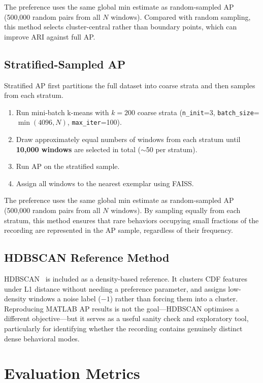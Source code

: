 \documentclass[11pt]{article}
\begin{document}
The preference uses the same global min estimate as random-sampled AP (500,000 random pairs from all $N$ windows). Compared with random sampling, this method selects cluster-central rather than boundary points, which can improve ARI against full AP.

\subsection{Stratified-Sampled AP}

Stratified AP first partitions the full dataset into coarse strata and then samples from each stratum.

\begin{enumerate}
    \item Run mini-batch k-means with $k = 200$ coarse strata (\texttt{n\_init}=3, \texttt{batch\_size}=$\min(4096, N)$, \texttt{max\_iter}=100).
    \item Draw approximately equal numbers of windows from each stratum until \textbf{10,000 windows} are selected in total ($\sim$50 per stratum).
    \item Run AP on the stratified sample.
    \item Assign all windows to the nearest exemplar using FAISS.
\end{enumerate}

The preference uses the same global min estimate as random-sampled AP (500,000 random pairs from all $N$ windows). By sampling equally from each stratum, this method ensures that rare behaviors occupying small fractions of the recording are represented in the AP sample, regardless of their frequency.

\subsection{HDBSCAN Reference Method}

HDBSCAN~\cite{campello2013} is included as a density-based reference. It clusters CDF features under L1 distance without needing a preference parameter, and assigns low-density windows a noise label ($-1$) rather than forcing them into a cluster. Reproducing MATLAB AP results is not the goal---HDBSCAN optimises a different objective---but it serves as a useful sanity check and exploratory tool, particularly for identifying whether the recording contains genuinely distinct dense behavioral modes.

\FloatBarrier
\section{Evaluation Metrics}
\end{document}
